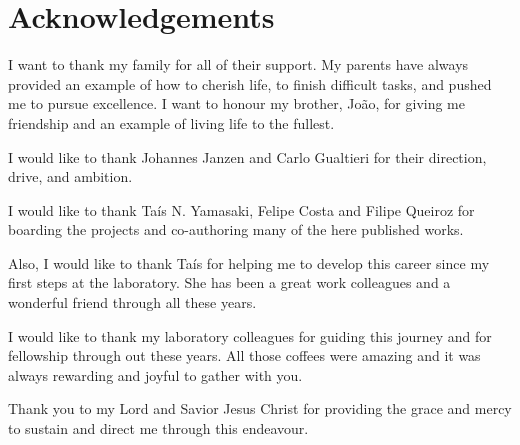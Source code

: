 \chapter*{Acknowledgements}
I want to thank my family for all of their support. My parents have always provided an example of how to cherish life, to finish difficult tasks, and pushed me to pursue excellence. I want to honour my brother, João, for giving me friendship and an example of living life to the fullest.

I would like to thank Johannes Janzen and Carlo Gualtieri for their direction, drive, and ambition.

I would like to thank Taís N. Yamasaki, Felipe Costa and Filipe Queiroz for boarding the projects and co-authoring many of the here published works.

Also, I would like to thank Taís for helping me to develop this career since my first steps at the laboratory. She has been a great work colleagues and a wonderful friend through all these years.

I would like to thank my laboratory colleagues for guiding this journey and for fellowship through out these years. All those coffees were amazing and it was always rewarding and joyful to gather with you.

Thank you to my Lord and Savior Jesus Christ for providing the grace and mercy to sustain and direct me through this endeavour.